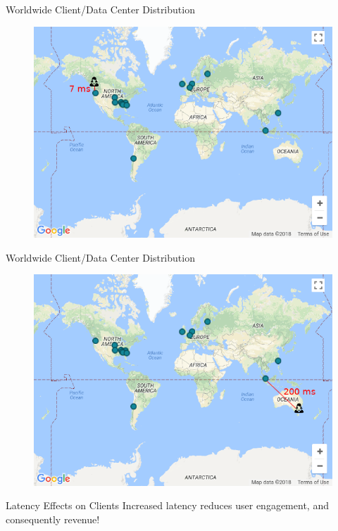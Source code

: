 \documentclass[10pt]{beamer}
\begin{document}
\begin{frame}{Worldwide Client/Data Center Distribution}
    \begin{figure}
        \center
        \includegraphics[scale=0.45]{apollo_google_vancouver}
    \end{figure}
\end{frame}

\begin{frame}{Worldwide Client/Data Center Distribution}
    \begin{figure}
        \center
        \includegraphics[scale=0.45]{apollo_google_oceania}
    \end{figure}
\end{frame}

\begin{frame}{Latency Effects on Clients}
    Increased latency reduces \alert{user engagement}, and consequently \alert{revenue}!~\cite{bing}
\end{frame}
\end{document}
